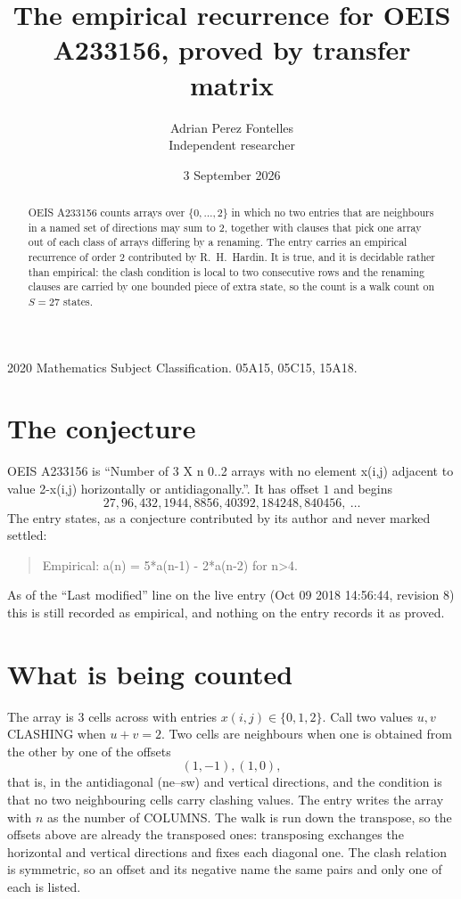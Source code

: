 \documentclass[11pt,a4paper]{article}
\title{The empirical recurrence for OEIS A233156, proved by transfer matrix}
\author{Adrian Perez Fontelles\\ \small Independent researcher}
\date{3 September 2026}
\theoremstyle{plain}
\theoremstyle{definition}
\begin{document}
\maketitle

\begin{abstract}
OEIS A233156 counts arrays over $\{0,\dots,2\}$ in which no two entries that are neighbours in
a named set of directions may sum to $2$, together with clauses that pick one array out of
each class of arrays differing by a renaming. The entry carries an empirical recurrence of
order $2$ contributed by R.~H.~Hardin. It is true, and it is decidable rather than
empirical: the clash condition is local to two consecutive rows and the renaming clauses are
carried by one bounded piece of extra state, so the count is a walk count on $S=27$ states.
\end{abstract}

\noindent\small 2020 Mathematics Subject Classification. 05A15, 05C15, 15A18.\normalsize

\section{The conjecture}

OEIS A233156 is ``Number of 3 X n 0..2 arrays with no element x(i,j) adjacent to value 2-x(i,j) horizontally or antidiagonally.''. It has offset $1$ and begins
\[
27, 96, 432, 1944, 8856, 40392, 184248, 840456,\ \dots
\]
The entry states, as a conjecture contributed by its author and never marked settled:
\begin{quote}
Empirical: a(n) = 5*a(n-1) - 2*a(n-2) for n>4.
\end{quote}
As of the ``Last modified'' line on the live entry (Oct 09 2018 14:56:44, revision 8) this is still
recorded as empirical, and nothing on the entry records it as proved.

\section{What is being counted}

The array is $3$ cells across with entries $x(i,j)\in\{0,1,2\}$. Call two values $u,v$ CLASHING
when $u+v=2$. Two cells are neighbours when one is obtained from the other by one of
the offsets
\[
(1,-1), (1,0),
\]
that is, in the antidiagonal (ne--sw) and vertical directions, and the condition is that no two neighbouring cells carry
clashing values. The entry writes the array with $n$ as the number of COLUMNS. The walk is run down the transpose, so the offsets above are already the transposed ones: transposing exchanges the horizontal and vertical directions and fixes each diagonal one. The clash relation is symmetric, so an offset and its negative name the
same pairs and only one of each is listed.
\end{document}
